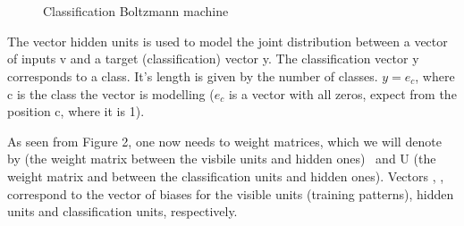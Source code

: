 \ \ \ \ \ \ \ \ \ \ \ \ \ \ \ \ \ \ \ \ \ \ \ \begin{figure}[h]
  \ \ \ \ \ \ \ \ \ \ 
  \caption{Classification Boltzmann machine}
\end{figure}



The vector hidden units is used to model the joint distribution between a
vector of inputs v and a target (classification) vector y. The classification
vector y corresponds to a class. It's length is given by the number of
classes. $y = e_c$, where c is the class the vector is modelling ($e_c$ is a
vector with all zeros, expect from the position c, where it is 1).

As seen from Figure 2, one now needs to weight matrices, which we will denote
by (the weight matrix between the visbile units and hidden ones) \
and U (the weight matrix and between the classification units and hidden
ones). Vectors \tmtextit{b}, \tmtextit{c}, \tmtextit{d} correspond to the
vector of biases for the visible units (training patterns), hidden units and
classification units, respectively.

